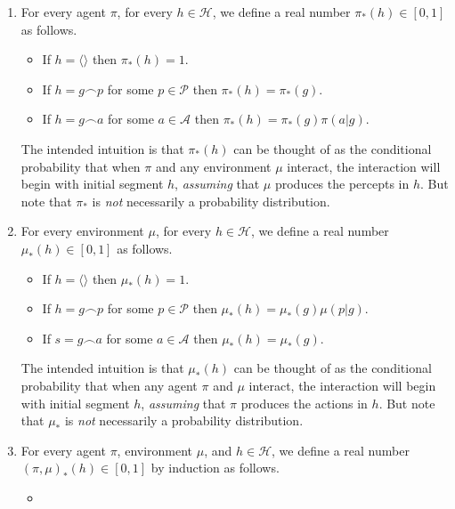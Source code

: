\documentclass[runningheads]{llncs}
\begin{document}
\begin{definition}
\label{pullbackdef}
    \begin{enumerate}
        \item
        For every agent $\pi$, for every $h\in\mathcal H$, we define a real number
        $\pi_*(h)\in[0,1]$ as follows.
        \begin{itemize}
            \item
            If $h=\langle\rangle$ then $\pi_*(h)=1$.
            \item
            If $h=g\frown p$ for some $p\in\mathcal P$ then $\pi_*(h)=\pi_*(g)$.
            \item
            If $h=g\frown a$ for some $a\in\mathcal A$ then $\pi_*(h)=\pi_*(g)\pi(a|g)$.
        \end{itemize}
        The intended intuition is that $\pi_*(h)$ can be thought of as the
        conditional probability that when $\pi$
        and any environment
        $\mu$ interact, the interaction will begin with initial segment
        $h$, \emph{assuming}
        that $\mu$ produces the percepts in $h$.
        But note that $\pi_*$ is \emph{not} necessarily a probability distribution.
        \item
        For every environment $\mu$, for every $h\in\mathcal H$, we define a real number
        $\mu_*(h)\in[0,1]$ as follows.
        \begin{itemize}
            \item
            If $h=\langle\rangle$ then $\mu_*(h)=1$.
            \item
            If $h=g\frown p$ for some $p\in\mathcal P$ then $\mu_*(h)=\mu_*(g)\mu(p|g)$.
            \item
            If $s=g\frown a$ for some $a\in\mathcal A$ then $\mu_*(h)=\mu_*(g)$.
        \end{itemize}
        The intended intuition is that $\mu_*(h)$ can be thought of as the
        conditional probability that when any agent $\pi$ and $\mu$ interact,
        the interaction will begin with initial segment $h$, \emph{assuming} that
        $\pi$ produces the actions in $h$.
        But note that $\mu_*$ is \emph{not} necessarily a probability distribution.
        \item
        For every agent $\pi$, environment $\mu$, and $h\in\mathcal H$, we define a
        real number $(\pi,\mu)_*(h)\in[0,1]$ by induction as follows.
        \begin{itemize}
            \item

\end{itemize}
\end{enumerate}
\end{definition}
\end{document}
